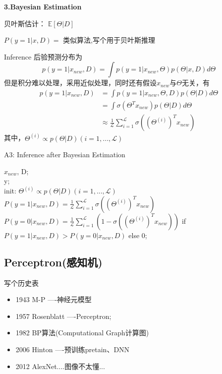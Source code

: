 \documentclass[UTF8]{ctexart}
\numberwithin{equation}{section}
\begin{document}
\textbf{3.Bayesian Estimation}

贝叶斯估计：
$\mathbb{E}[\Theta | D]$

$P(y=1|x, D) = $
类似算法,写个用于贝叶斯推理

Inference
后验预测分布为
\begin{equation*}
    p(y=1|x_{new}, D) = \int p(y=1 | x_{new}, \Theta)p(\Theta|x,D)d\Theta
\end{equation*}
但是积分难以处理，采用近似处理，同时还有假设$x_{new}$与$\Theta$无关，有
\begin{equation*}
    \begin{aligned}
        p(y=1|x_{new}, D) &= \int p(y=1 | x_{new}, \Theta, D)p(\Theta|D)d\Theta \\
        &= \int \sigma(\Theta^Tx_{new})p(\Theta |D)d\Theta \\
        &\approx \frac{1}{\mathcal{L}}\sum_{i=1}^{\mathcal{L}} \sigma((\Theta^{(i)})^Tx_{new} )
    \end{aligned}
\end{equation*}
其中，${\Theta}^{(i)} \propto p(\Theta | D) (i=1,..., \mathcal{L})$

\begin{algorithm}[htb]
    \caption{A3: Inference after Bayesian Estimation}
    \label{alg:A3}
    \begin{algorithmic}[1]
    \REQUIRE
    $x_{new}$, D; \\
    \ENSURE 
    y; \\
    \STATE init: ${\Theta}^{(i)} \propto p(\Theta | D) (i=1,..., \mathcal{L})$
    \STATE $P(y=1|x_{new},D)=\frac{1}{\mathcal{L}} \sum_{i=1}^{\mathcal{L}} \sigma((\Theta^{(i)})^T x_{new})$
    \STATE $P(y=0|x_{new},D)=\frac{1}{\mathcal{L}}\sum_{i=1}^{\mathcal{L}} (1-\sigma((\Theta^{(i)})^Tx_{new}) )$
     if $P(y=1|x_{new},D) > P(y=0|x_{new},D)$ else 0;
    \end{algorithmic}
\end{algorithm}


\subsection{Perceptron(感知机)}

写个历史表
\begin{itemize}
    \item 1943 M-P ----神经元模型
    \item 1957 Rosenblatt ----Perceptron;
    \item 1982 BP算法(Computational Graph计算图)
    \item 2006 Hinton ----预训练pretain、DNN
    \item 2012 AlexNet....图像不太懂...
\end{itemize}
\end{document}
